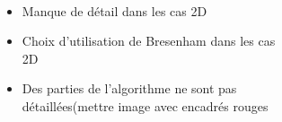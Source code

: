 \begin{frame}[fragile=singleslide]{\insertsectionhead}

  \framesubtitle{\insertsubsectionhead}
  \begin{columns}[T,onlytextwidth]
      \begin{itemize}
        \vspace{.55cm}
        \item Manque de détail dans les cas 2D
        \vspace{.3cm}
        \item Choix d’utilisation de Bresenham dans les cas 2D
        \vspace{.3cm}
        \item Des parties de l'algorithme ne sont pas détaillées(mettre image avec encadrés rouges
      \end{itemize}
    \begin{figure}
        \begin{subfigure}{.9\textwidth}
        \end{subfigure}
      \end{figure}
  \end{columns}
\end{frame}

